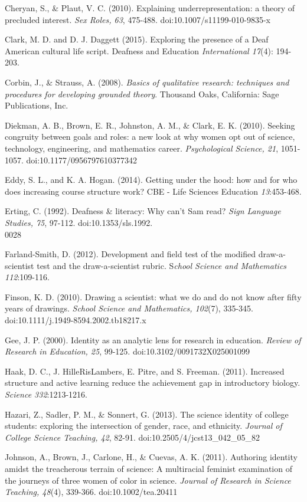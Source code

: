 \documentclass[11.5pt]{sig-alternate} %
\begin{document}
Cheryan, S., \& Plaut, V. C. (2010). Explaining underrepresentation: a theory of precluded interest. \textit{Sex Roles, 63}, 475-488. doi:10.1007/s11199-010-9835-x

Clark, M. D. and D. J. Daggett (2015). Exploring the presence of a Deaf American cultural life script. Deafness and Education \textit{International 17}(4): 194-203.

Corbin, J., \& Strauss, A. (2008). \textit{Basics of qualitative research: techniques and procedures for developing grounded theory}. Thousand Oaks, California: Sage Publications, Inc.

Diekman, A. B., Brown, E. R., Johnston, A. M., \& Clark, E. K. (2010). Seeking congruity between goals and roles: a new look at why women opt out of science, technology, engineering, and mathematics career. \textit{Psychological Science, 21}, 1051-1057. doi:10.1177/0956797610377342

Eddy, S. L., and K. A. Hogan. (2014). Getting under the hood: how and for who does increasing course structure work? CBE - Life Sciences Education \textit{13}:453-468.

Erting, C. (1992). Deafness \& literacy: Why can't Sam read? \textit{Sign Language Studies, 75}, 97-112. doi:10.1353/sls.1992.\\0028

Farland-Smith, D. (2012). Development and field test of the modified draw-a-scientist test and the draw-a-scientist rubric. S\textit{chool Science and Mathematics 112}:109-116.

Finson, K. D. (2010). Drawing a scientist: what we do and do not know after fifty years of drawings. \textit{School Science and Mathematics, 102}(7), 335-345. doi:10.1111/j.1949-8594.2002.tb18217.x

Gee, J. P. (2000). Identity as an analytic lens for research in education. \textit{Review of Research in Education, 25}, 99-125. doi:10.3102/0091732X025001099

Haak, D. C., J. HilleRisLambers, E. Pitre, and S. Freeman. (2011). Increased structure and active learning reduce the achievement gap in introductory biology. \textit{Science 332}:1213-1216.

Hazari, Z., Sadler, P. M., \& Sonnert, G. (2013). The science identity of college students: exploring the intersection of gender, race, and ethnicity. \textit{Journal of College Science Teaching, 42}, 82-91. doi:10.2505/4/jcst13\_042\_05\_82

Johnson, A., Brown, J., Carlone, H., \& Cuevas, A. K. (2011). Authoring identity amidst the treacherous terrain of science: A multiracial feminist examination of the journeys of three women of color in science. \textit{Journal of Research in Science Teaching, 48}(4), 339-366. doi:10.1002/tea.20411
\end{document}
